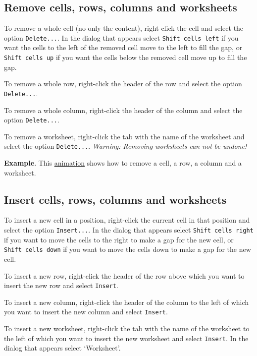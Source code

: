 \subsection{Remove cells, rows, columns and worksheets}\hypertarget{remove-cells-rows-columns-and-worksheets}{}\label{remove-cells-rows-columns-and-worksheets}

To remove a whole cell (no only the content), right-click the cell and select the option \texttt{Delete...}. In the dialog that appears select \texttt{Shift cells left} if you want the cells to the left of the removed cell move to the left to fill the gap, or \texttt{Shift cells up} if you want the cells below the removed cell move up to fill the gap.

To remove a whole row, right-click the header of the row and select the option  \texttt{Delete...}.

To remove a whole column, right-click the header of the column and select the option  \texttt{Delete...}.

To remove a worksheet, right-click the tab with the name of the worksheet and select the option \texttt{Delete...}. 
\emph{Warning: Removing worksheets can not be undone!}

\textbf{Example}.  This \href{http://aprendeconalf.es/office/excel/manual/img/example_data_remove.gif}{animation} shows how to remove a cell, a row, a column and a worksheet.

\subsection{Insert cells, rows, columns and worksheets}\hypertarget{insert-cells-rows-columns-and-worksheets}{}\label{insert-cells-rows-columns-and-worksheets}

To insert a new cell in a position, right-click the current cell in that position and select the option \texttt{Insert...}.  In the dialog that appears select \texttt{Shift cells right} if you want to move the cells to the right to make a gap for the new cell, or \texttt{Shift cells down} if you want to move the cells down to make a gap for the new cell.

To insert a new row, right-click the header of the row above which you want to insert the new row and select \texttt{Insert}.

To insert a new column, right-click the header of the column to the left of which you want to insert the new column and select \texttt{Insert}.

To insert a new worksheet, right-click the tab with the name of the worksheet to the left of which you want to insert the new worksheet and select \texttt{Insert}.
In the dialog that appears select `Worksheet'.

